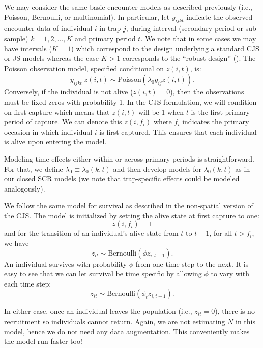 We may consider the same basic encounter
models as described previously (i.e., Poisson, Bernoulli, or
multinomial). In particular, let $y_{ijkt}$ indicate the observed
encounter data of individual $i$ in trap $j$, during interval
(secondary period or sub-sample) $k=1,2,\ldots,K$ and primary period $t$. We note that in
some cases we may have intervals ($K=1$) which correspond to the
design underlying a standard CJS or JS models whereas the case $K>1$
corresponds to the ``robust design'' (\citealt{pollock:1982}).  The
Poisson observation model, specified conditional on $z(i,t)$, is:
 \[
  y_{ijkt}|z(i,t) \sim
\mbox{Poisson}(\lambda_0 g_{ij} z(i,t)).
\]
Conversely, if the
individual is not alive ($z(i,t)=0$), then the observations must be
fixed zeros with probability 1.   In the CJS formulation, we will condition on first capture
which means that $z(i,t)$ will
be 1 when $t$ is the first primary period of capture.  We can denote this $z(i, f_i)$
where $f_i$ indicates the primary occasion in which individual $i$ is first captured.
This ensures that each individual is alive upon entering the model.

Modeling time-effects either
within or across primary periods
is straightforward. For that, we define $\lambda_{0} \equiv
\lambda_{0}(k,t)$ and then develop models for
$\lambda_{0}(k,t)$ as in our closed SCR models (we note that
trap-specific effects could be modeled analogously).

We follow the same model for survival as described in the non-spatial version of the
CJS.  The model is initialized by setting the alive
state at first capture to one:
\[
 z(i,f_i) = 1
\]
and for the transition of an individual's alive state from $t$ to $t+1$, for
all $t > f_i$, we have
\[
z_{it} \sim \mbox{Bernoulli}( \phi z_{i,t-1}).
\]
An individual survives with probability
$\phi$ from one time step to the next.  It is easy to see that we can let
survival be time specific by allowing $\phi$ to vary with each time step:
\[
 z_{it} \sim \mbox{Bernoulli}( \phi_t z_{i,t-1}).
\]

In either case, once an individual leaves the
population (i.e., $z_{it} = 0$), there is no recruitment so individuals cannot
return.  Again, we are not estimating $N$ in this model, hence we do not need
any data augmentation.  This conveniently makes the model run
faster too!


